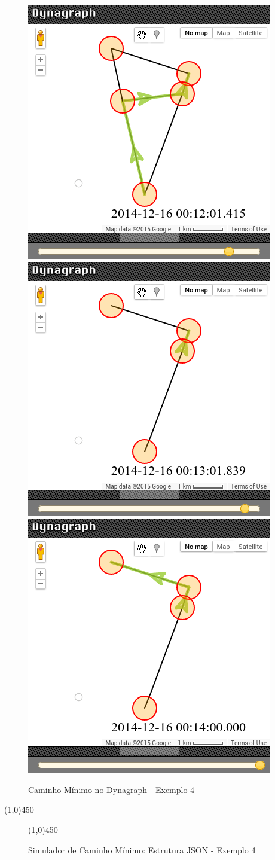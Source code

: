 \begin{figure}[htbp]
 \includegraphics[width=.35\textwidth]{chapters/fig/validacao/dyn4f.png}
 \includegraphics[width=.35\textwidth]{chapters/fig/validacao/dyn4g.png}
 \includegraphics[width=.35\textwidth]{chapters/fig/validacao/dyn4h.png}
\caption{Caminho Mínimo no Dynagraph - Exemplo 4}
\label{fig:dyn4}
\end{figure}
\FloatBarrier

\begin{center}
  \line(1,0){450}
\end{center}

\begin{figure}[htbp]
  \begin{center}
    \line(1,0){450}
  \end{center}
  \centering
  \caption{Simulador de Caminho Mínimo: Estrutura JSON - Exemplo 4}
  \label{fig:jsondyn4}
\end{figure}
\FloatBarrier
